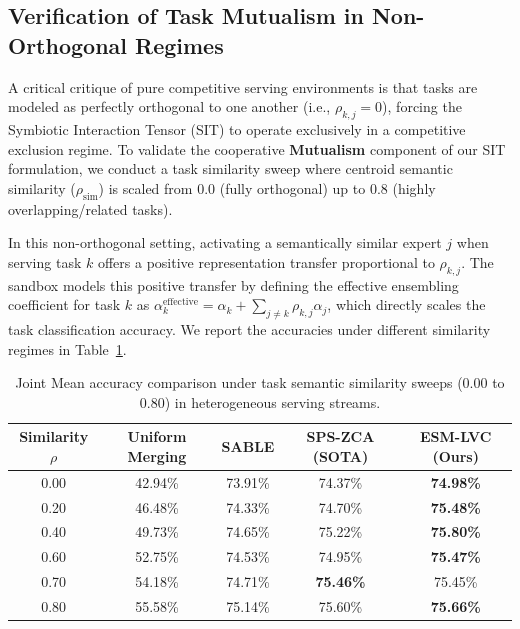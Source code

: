 \subsection{Verification of Task Mutualism in Non-Orthogonal Regimes}
A critical critique of pure competitive serving environments is that tasks are modeled as perfectly orthogonal to one another (i.e., $\rho_{k, j} = 0$), forcing the Symbiotic Interaction Tensor (SIT) to operate exclusively in a competitive exclusion regime. To validate the cooperative \textbf{Mutualism} component of our SIT formulation, we conduct a task similarity sweep where centroid semantic similarity ($\rho_{\text{sim}}$) is scaled from $0.0$ (fully orthogonal) up to $0.8$ (highly overlapping/related tasks). 

In this non-orthogonal setting, activating a semantically similar expert $j$ when serving task $k$ offers a positive representation transfer proportional to $\rho_{k, j}$. The sandbox models this positive transfer by defining the effective ensembling coefficient for task $k$ as $\alpha^{\text{effective}}_k = \alpha_k + \sum_{j \neq k} \rho_{k, j} \alpha_j$, which directly scales the task classification accuracy. We report the accuracies under different similarity regimes in Table~\ref{tab:mutualism_results}.

\begin{table}[t]
\caption{Joint Mean accuracy comparison under task semantic similarity sweeps (0.00 to 0.80) in heterogeneous serving streams.}
\label{tab:mutualism_results}
\vskip 0.15in
\begin{center}
\begin{small}
\begin{sc}
\begin{tabular}{ccccc}
\toprule
Similarity $\rho$ & Uniform Merging & SABLE & SPS-ZCA (SOTA) & \textbf{ESM-LVC (Ours)} \\
\midrule
0.00 & 42.94\% & 73.91\% & 74.37\% & \textbf{74.98\%} \\
0.20 & 46.48\% & 74.33\% & 74.70\% & \textbf{75.48\%} \\
0.40 & 49.73\% & 74.65\% & 75.22\% & \textbf{75.80\%} \\
0.60 & 52.75\% & 74.53\% & 74.95\% & \textbf{75.47\%} \\
0.70 & 54.18\% & 74.71\% & \textbf{75.46\%} & 75.45\% \\
0.80 & 55.58\% & 75.14\% & 75.60\% & \textbf{75.66\%} \\
\bottomrule
\end{tabular}
\end{sc}
\end{small}
\end{center}
\vskip -0.1in
\end{table}

